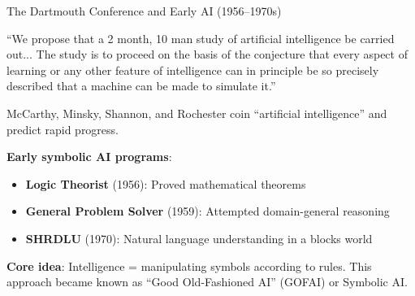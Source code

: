 \documentclass[aspectratio=169,11pt]{beamer}
\begin{document}
\begin{frame}{The Dartmouth Conference and Early AI (1956--1970s)}
\begin{casestudybox}
\scriptsize
``We propose that a 2 month, 10 man study of artificial intelligence be carried out... The study is to proceed on the basis of the conjecture that every aspect of learning or any other feature of intelligence can in principle be so precisely described that a machine can be made to simulate it.''
\end{casestudybox}

\vspace{0.2em}
McCarthy, Minsky, Shannon, and Rochester coin ``artificial intelligence'' and predict rapid progress.

\vspace{0.2em}
\textbf{Early symbolic AI programs}:
\begin{itemize}
    \item \textbf{Logic Theorist} (1956): Proved mathematical theorems
    \item \textbf{General Problem Solver} (1959): Attempted domain-general reasoning
    \item \textbf{SHRDLU} (1970): Natural language understanding in a blocks world
\end{itemize}

\textbf{Core idea}: Intelligence = manipulating symbols according to rules. This approach became known as ``Good Old-Fashioned AI'' (GOFAI) or Symbolic AI.
\end{frame}
\end{document}
